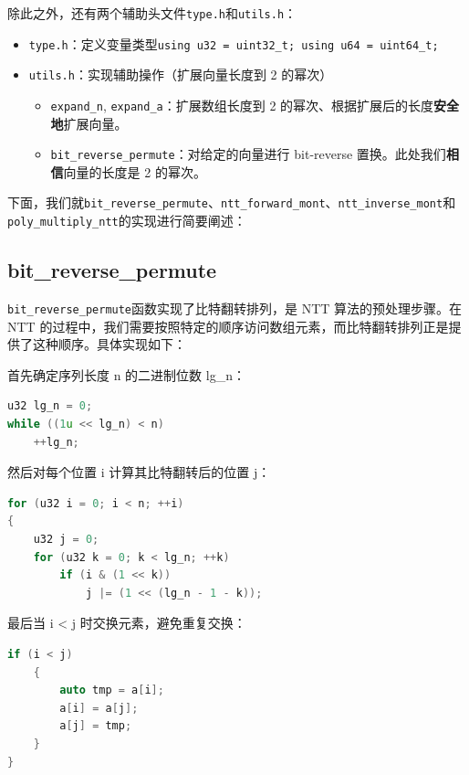 \documentclass[a4paper]{article}
\begin{document}
除此之外，还有两个辅助头文件\texttt{type.h}和\texttt{utils.h}：

\begin{itemize}
    \item \texttt{type.h}：定义变量类型\texttt{using u32 = uint32\_t; using u64 = uint64\_t;}
    \item \texttt{utils.h}：实现辅助操作（扩展向量长度到 2 的幂次）
    \begin{itemize}
        \item \texttt{expand\_n}, \texttt{expand\_a}：扩展数组长度到 2 的幂次、根据扩展后的长度\textbf{安全地}扩展向量。
        \item \texttt{bit\_reverse\_permute}：对给定的向量进行 bit-reverse 置换。此处我们\textbf{相信}向量的长度是 2 的幂次。
    \end{itemize}
\end{itemize}

下面，我们就\texttt{bit\_reverse\_permute}、\texttt{ntt\_forward\_mont}、\texttt{ntt\_inverse\_mont}和\texttt{poly\_multiply\_ntt}的实现进行简要阐述：

\subsection{bit\_reverse\_permute}

\texttt{bit\_reverse\_permute}函数实现了比特翻转排列，是 NTT 算法的预处理步骤。在 NTT 的过程中，我们需要按照特定的顺序访问数组元素，而比特翻转排列正是提供了这种顺序。具体实现如下：

首先确定序列长度 n 的二进制位数 lg\_n：

\begin{lstlisting}[language=C++]
u32 lg_n = 0;
while ((1u << lg_n) < n)
    ++lg_n;
\end{lstlisting}

然后对每个位置 i 计算其比特翻转后的位置 j：

\begin{lstlisting}[language=C++]
for (u32 i = 0; i < n; ++i)
{
    u32 j = 0;
    for (u32 k = 0; k < lg_n; ++k)
        if (i & (1 << k))
            j |= (1 << (lg_n - 1 - k));
\end{lstlisting}

最后当 i < j 时交换元素，避免重复交换：

\begin{lstlisting}[language=C++]
    if (i < j)
    {
        auto tmp = a[i];
        a[i] = a[j];
        a[j] = tmp;
    }
}
\end{lstlisting}
\end{document}

